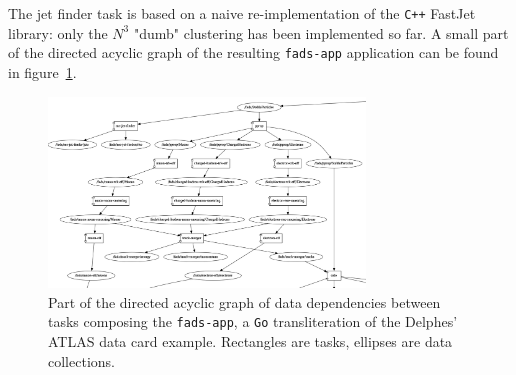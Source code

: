 \documentclass[a4paper]{jpconf}
\begin{document}
The jet finder task is based on a naive re-implementation of the \texttt{C++} FastJet~\cite{ref-fastjet} library: only the $N^3$ "dumb" clustering has been implemented so far.
A small part of the directed acyclic graph of the resulting \texttt{fads-app} application can be found in figure~\ref{fig-dflow}.

\begin{figure}[h]
	\begin{center}
 \includegraphics[width=0.75\textwidth]{figs/fads-dflow-detail.png}
	\end{center}
	\caption{\label{fig-dflow}Part of the directed acyclic graph of data dependencies between tasks composing the \texttt{fads-app}, a \texttt{Go} transliteration of the Delphes' ATLAS data card example. Rectangles are tasks, ellipses are data collections.}
\end{figure}
\end{document}
